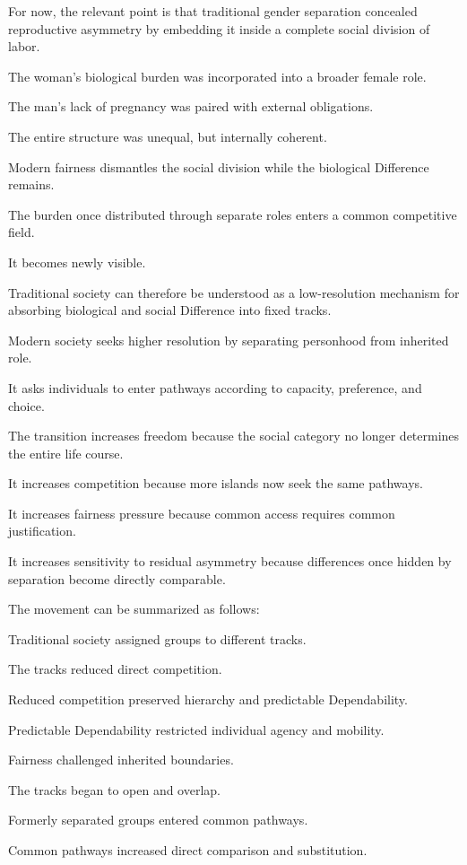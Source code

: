 For now, the relevant point is that traditional gender separation concealed reproductive asymmetry by embedding it inside a complete social division of labor.

The woman’s biological burden was incorporated into a broader female role.

The man’s lack of pregnancy was paired with external obligations.

The entire structure was unequal, but internally coherent.

Modern fairness dismantles the social division while the biological Difference remains.

The burden once distributed through separate roles enters a common competitive field.

It becomes newly visible.

Traditional society can therefore be understood as a low-resolution mechanism for absorbing biological and social Difference into fixed tracks.

Modern society seeks higher resolution by separating personhood from inherited role.

It asks individuals to enter pathways according to capacity, preference, and choice.

The transition increases freedom because the social category no longer determines the entire life course.

It increases competition because more islands now seek the same pathways.

It increases fairness pressure because common access requires common justification.

It increases sensitivity to residual asymmetry because differences once hidden by separation become directly comparable.

The movement can be summarized as follows:

Traditional society assigned groups to different tracks.

The tracks reduced direct competition.

Reduced competition preserved hierarchy and predictable Dependability.

Predictable Dependability restricted individual agency and mobility.

Fairness challenged inherited boundaries.

The tracks began to open and overlap.

Formerly separated groups entered common pathways.

Common pathways increased direct comparison and substitution.

